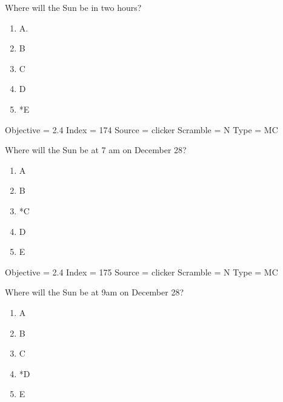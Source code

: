 \documentclass[11pt]{article}
\begin{document}
\begin{enumerate}
\begin{minipage}{\textwidth}
\begin{minipage}{\textwidth}
\item Where will the Sun be in two hours?
\begin{multicols}{3}
\begin{enumerate} 
\setlength{\itemsep}{1pt} 
\setlength{\parskip}{0pt} 
\setlength{\parsep}{0pt}
\setlength{\multicolsep}{1pt} 
\item A.
\item B
\item C
\item D
\item *E
\end{enumerate} 
\vfill 
\end{multicols}

Objective = 2.4
Index = 174
Source = clicker
Scramble = N
Type = MC
\end{minipage}
\end{minipage}
\vskip 0.20in

\begin{minipage}{\textwidth}
\begin{minipage}{\textwidth}
\item Where will the Sun be at 7 am on December 28?
\begin{multicols}{3}
\begin{enumerate} 
\setlength{\itemsep}{1pt} 
\setlength{\parskip}{0pt} 
\setlength{\parsep}{0pt}
\setlength{\multicolsep}{1pt} 
\item A
\item B
\item *C
\item D
\item E
\end{enumerate} 
\vfill 
\end{multicols}

Objective = 2.4
Index = 175
Source = clicker
Scramble = N
Type = MC
\end{minipage}
\end{minipage}
\vskip 0.20in

\begin{minipage}{\textwidth}
\begin{minipage}{\textwidth}
\item Where will the Sun be at 9am on December 28?
\begin{multicols}{3}
\begin{enumerate} 
\setlength{\itemsep}{1pt} 
\setlength{\parskip}{0pt} 
\setlength{\parsep}{0pt}
\setlength{\multicolsep}{1pt} 
\item A
\item B
\item C
\item *D
\item E
\end{enumerate} 
\vfill 
\end{multicols}


\end{minipage}
\end{minipage}
\end{enumerate}
\end{document}
